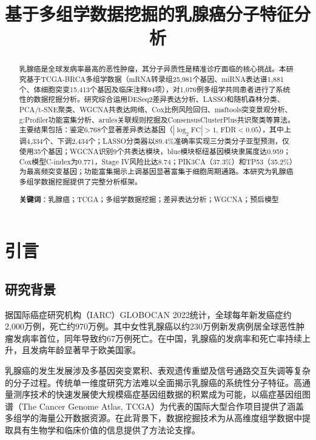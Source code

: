 \documentclass[12pt,a4paper]{ctexart}
\title{\heiti\zihao{3} 基于多组学数据挖掘的乳腺癌分子特征分析}
\author{}
\date{}
\begin{document}
\maketitle

\begin{abstract}
\noindent
乳腺癌是全球发病率最高的恶性肿瘤，其分子异质性是精准诊疗面临的核心挑战。本研究基于TCGA-BRCA多组学数据（mRNA转录组25,981个基因、miRNA表达谱1,881个、体细胞突变15,413个基因及临床注释94项），对1,076例多组学共同患者进行了系统性的数据挖掘分析。研究综合运用DESeq2差异表达分析、LASSO和随机森林分类、PCA/t-SNE聚类、WGCNA共表达网络、Cox比例风险回归、maftools突变景观分析、g:Profiler功能富集分析、arules关联规则挖掘及ConsensusClusterPlus共识聚类等算法。主要结果包括：鉴定6,768个显著差异表达基因（$|\log_2\text{FC}|>1$, FDR$<0.05$），其中上调4,334个、下调2,434个；LASSO分类器以89.4\%准确率实现三分类分子亚型预测，仅使用35个基因；WGCNA识别9个共表达模块，blue模块枢纽基因模块隶属度达0.959；Cox模型C-index为0.771，Stage IV风险比达8.74；PIK3CA（37.3\%）和TP53（35.2\%）为最高频突变基因；功能富集揭示上调基因显著富集于细胞周期通路。本研究为乳腺癌多组学数据挖掘提供了完整分析框架。

\vspace{1em}
\noindent\textbf{关键词}：乳腺癌；TCGA；多组学数据挖掘；差异表达分析；WGCNA；预后模型
\end{abstract}

\newpage

\section{引言}

\subsection{研究背景}

据国际癌症研究机构（IARC）GLOBOCAN 2022统计，全球每年新发癌症约2,000万例，死亡约970万例\cite{sung2024global}。其中女性乳腺癌以约230万例新发病例居全球恶性肿瘤发病率首位，同年导致约67万例死亡。在中国，乳腺癌的发病率和死亡率持续上升，且发病年龄显著早于欧美国家。

乳腺癌的发生发展涉及多基因突变累积、表观遗传重塑及信号通路交互失调等复杂的分子过程\cite{hanahan2011hallmarks}。传统单一维度研究方法难以全面揭示乳腺癌的系统性分子特征。高通量测序技术的快速发展使大规模癌症基因组数据的积累成为可能，以癌症基因组图谱（The Cancer Genome Atlas, TCGA）为代表的国际大型合作项目提供了涵盖多组学的海量公开数据资源\cite{tcga2012comprehensive}。在此背景下，数据挖掘技术为从高维度组学数据中提取具有生物学和临床价值的信息提供了方法论支撑。
\end{document}
